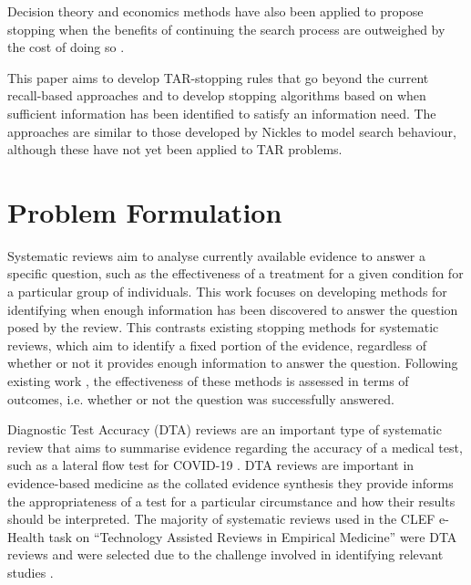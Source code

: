 \documentclass[sigconf,natbib=true,anonymous=true]{acmart}
\begin{document}
Decision theory and economics methods have also been applied to propose stopping when the benefits of continuing the search process are outweighed by the cost of doing so \cite{cooper1976paradoxical,azzopardi2011economics}. 

This paper aims to develop TAR-stopping rules that go beyond the current recall-based approaches and to develop stopping algorithms based on when sufficient information has been identified to satisfy an information need. The approaches are similar to those developed by Nickles \cite{nickles1995judgment} to model search behaviour, although these have not yet been applied to TAR problems. 


\section{Problem Formulation}
 
Systematic reviews aim to analyse currently available evidence to answer a specific question, such as the effectiveness of a treatment for a given condition for a particular group of individuals.  This work focuses on developing methods for identifying when enough information has been discovered to answer the question posed by the review. This contrasts existing stopping methods for systematic reviews, which aim to identify a fixed portion of the evidence, regardless of whether or not it provides enough information to answer the question. Following existing work \cite{kusa2023outcome}, the effectiveness of these methods is assessed in terms of outcomes, i.e. whether or not the question was successfully answered. 

Diagnostic Test Accuracy (DTA) reviews are an important type of systematic review that aims to summarise evidence regarding the accuracy of a medical test, such as a lateral flow test for COVID-19 \cite{cochrane_infectious_diseases_group_rapid_2022}. DTA reviews are important in evidence-based medicine as the collated evidence synthesis they provide informs the appropriateness of a test for a particular circumstance and how their results should be interpreted. The majority of systematic reviews used in the CLEF e-Health task on ``Technology Assisted Reviews in Empirical Medicine'' were DTA reviews and were selected due to the challenge involved in identifying relevant studies \cite{kanoulas2017clef, kanoulas2018clef,kanoulas2019clef}.
\end{document}
